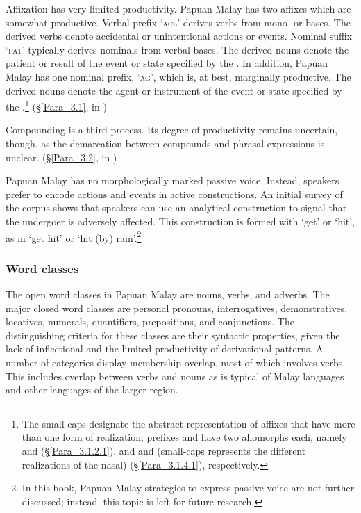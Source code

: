 Affixation has very limited productivity. Papuan Malay has two affixes which are somewhat productive. Verbal prefix  ‘\textsc{acl}’ derives  verbs from mono- or  bases. The derived verbs denote accidental or unintentional actions or events. Nominal suffix  ‘\textsc{pat}’ typically derives nominals from verbal bases. The derived nouns denote the patient or result of the event or state specified by the . In addition, Papuan Malay has one nominal prefix,  ‘\textsc{ag}’, which is, at best, marginally productive. The derived nouns denote the agent or instrument of the event or state specified by the .\footnote{The small caps designate the abstract representation of affixes that have more than one form of realization; prefixes  and  have two allomorphs each, namely  and  (§\ref{Para_3.1.2.1}), and \textitbf{)-} and \textitbf{)-} (small-caps  represents the different realizations of the nasal) (§\ref{Para_3.1.4.1}), respectively.} (§\ref{Para_3.1}, in )

Compounding is a third  process. Its degree of productivity remains uncertain, though, as the demarcation between compounds and phrasal expressions is unclear. (§\ref{Para_3.2}, in )



Papuan Malay has no morphologically marked passive voice. Instead, speakers prefer to encode actions and events in active constructions. An initial survey of the corpus shows that speakers can use an analytical construction to signal that the undergoer is adversely affected. This construction is formed with   ‘get’ or  ‘hit’, as in  ‘get hit’ or  ‘hit (by) rain’.\footnote{In this book, Papuan Malay strategies to express passive voice are not further discussed; instead, this topic is left for future research.}\\


\subsubsection[Word classes]{Word classes}\label{Para_1.6.1.3}
The open word classes in Papuan Malay are nouns, verbs, and adverbs. The major closed word classes are personal pronouns, interrogatives, demonstratives, locatives, numerals, quantifiers, prepositions, and conjunctions. The distinguishing criteria for these classes are their syntactic properties, given the lack of inflectional  and the limited productivity of derivational patterns. A number of categories display membership overlap, most of which involves verbs. This includes overlap between verbs and nouns as is typical of Malay languages and other  languages of the larger region.



